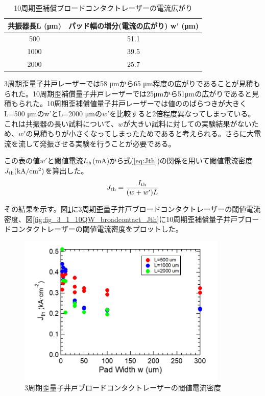 \begin{table}[h]
  \caption{10周期歪補償ブロードコンタクトレーザーの電流広がり}
  \label{table:table_10QW_broadcontact_w_eff}
  \centering
  \begin{tabular}{cc}
    \hline
    共振器長L (\si{\micro\metre})  & パッド幅の増分(電流の広がり) w' (\si{\micro\metre})   \\
    \hline \hline
     500 & 51.1  \\
    1000  & 39.5 \\
    2000  & 25.7 \\ 
    \hline
  \end{tabular}
\end{table}

3周期歪量子井戸レーザーでは58 \si{\micro\metre}から65 \si{\micro\metre}程度の広がりであることが見積もられた。10周期歪補償量子井戸レーザーでは25\si{\micro\metre}から51\si{\micro\metre}の広がりであると見積もられた。10周期歪補償値量子井戸レーザーでは値ののばらつきが大きくL=500 \si{\micro\metre}のw'とL=2000 \si{\micro\metre}の$w'$を比較すると2倍程度異なってしまっている。これは共振器の長い試料について、$w$が大きい試料に対しての実験結果がないため、$w'$の見積もりが小さくなってしまったためであると考えられる。さらに大電流を流して発振させる実験を行うことが必要である。


この表の値$w'$と閾値電流$I_{\rm{th}}$(mA)から式(\ref{eq:Jth})の関係を用いて閾値電流密度$J_{\rm{th}} \rm{(kA/cm^2)}$を算出した。
\begin{eqnarray}
J_{\rm{th}}=\dfrac{I_{\rm{th}}}{(w+w')L}
\label{eq:Jth}
\end{eqnarray}

その結果を示す。図\ref{fig:fig_3_1_3QW_broadcontact_Jth}に3周期歪量子井戸ブロードコンタクトレーザーの閾値電流密度、図\ref{fig:fig_3_1_10QW_broadcontact_Jth}に10周期歪補償量子井戸ブロードコンタクトレーザーの閾値電流密度をプロットした。

\begin{figure}[h]
	\centering
	\includegraphics[width=10cm]{figure/fig_3_1_3QW_broadcontact_Jth.png}
		\caption{3周期歪量子井戸ブロードコンタクトレーザーの閾値電流密度}
		\label{fig:fig_3_1_3QW_broadcontact_Jth}
\end{figure}

